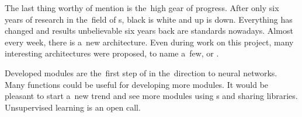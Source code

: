 The last thing worthy of mention is the~high gear of progress. After only six 
years of research in the~field of s, black is white and up is down. 
Everything has changed and results unbelievable six years back are standards 
nowadays. Almost every week, there is a~new architecture. Even during work on 
this project, many interesting architectures were proposed, to name a~few, 
\cite{masklab} or \cite{panoptic}.

Developed modules are the~first step of   in the~direction to 
neural networks. Many functions could be useful for developing more modules. It 
would be pleasant to start a~new trend and see more modules using s and 
sharing libraries. Unsupervised learning is an open call.
